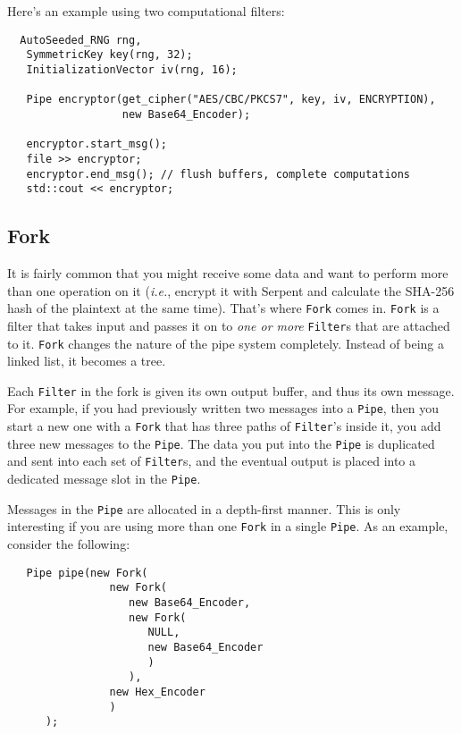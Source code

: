 \documentclass{article}
\newcommand{\type}[1]{\texttt{#1}}
\newcommand{\ie}[0]{\emph{i.e.}}
\begin{document}
Here's an example using two computational filters:

\begin{verbatim}
  AutoSeeded_RNG rng,
   SymmetricKey key(rng, 32);
   InitializationVector iv(rng, 16);

   Pipe encryptor(get_cipher("AES/CBC/PKCS7", key, iv, ENCRYPTION),
                  new Base64_Encoder);

   encryptor.start_msg();
   file >> encryptor;
   encryptor.end_msg(); // flush buffers, complete computations
   std::cout << encryptor;
\end{verbatim}

\subsection{Fork}

It is fairly common that you might receive some data and want to
perform more than one operation on it (\ie, encrypt it with Serpent
and calculate the SHA-256 hash of the plaintext at the same
time). That's where \type{Fork} comes in. \type{Fork} is a filter that
takes input and passes it on to \emph{one or more} \type{Filter}s
that are attached to it. \type{Fork} changes the nature of the pipe
system completely. Instead of being a linked list, it becomes a tree.

Each \type{Filter} in the fork is given its own output buffer, and
thus its own message. For example, if you had previously written two
messages into a \type{Pipe}, then you start a new one with a
\type{Fork} that has three paths of \type{Filter}'s inside it, you
add three new messages to the \type{Pipe}. The data you put into the
\type{Pipe} is duplicated and sent into each set of \type{Filter}s,
and the eventual output is placed into a dedicated message slot in the
\type{Pipe}.

Messages in the \type{Pipe} are allocated in a depth-first manner. This is only
interesting if you are using more than one \type{Fork} in a single \type{Pipe}.
As an example, consider the following:

\begin{verbatim}
   Pipe pipe(new Fork(
                new Fork(
                   new Base64_Encoder,
                   new Fork(
                      NULL,
                      new Base64_Encoder
                      )
                   ),
                new Hex_Encoder
                )
      );
\end{verbatim}
\end{document}
